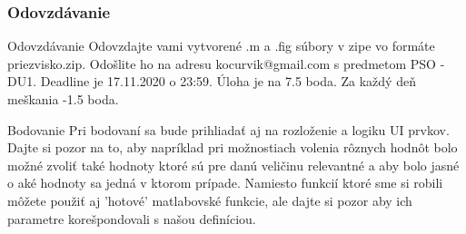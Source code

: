 \documentclass{beamer}
\begin{document}
\begin{frame}
\frametitle{Odovzdávanie}
\begin{block}{Odovzdávanie}
Odovzdajte vami vytvorené .m a .fig súbory v zipe vo formáte priezvisko.zip. Odošlite ho na adresu kocurvik@gmail.com s predmetom PSO - DU1. Deadline je 17.11.2020 o 23:59. Úloha je na 7.5 boda. Za každý deň meškania -1.5 boda.
\end{block}

\begin{block}{Bodovanie}
Pri bodovaní sa bude prihliadať aj na rozloženie a logiku UI prvkov. Dajte si pozor na to, aby napríklad pri možnostiach volenia rôznych hodnôt bolo možné zvoliť také hodnoty ktoré sú pre danú veličinu relevantné a aby bolo jasné o aké hodnoty sa jedná v ktorom prípade. Namiesto funkcií ktoré sme si robili môžete použiť aj 'hotové' matlabovské funkcie, ale dajte si pozor aby ich parametre korešpondovali s našou definíciou.
\end{block}
\end{frame}
\end{document}
